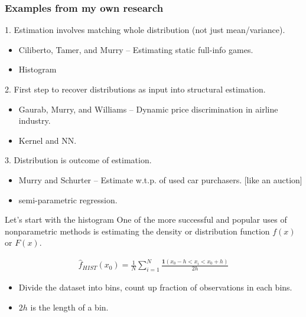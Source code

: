 \documentclass[11pt, aspectratio=169]{beamer}
\begin{document}

\begin{frame}[c]\frametitle{Examples from my own research}
    

1. Estimation involves matching whole distribution (not just mean/variance).\\[-.25em]
\begin{itemize}
  \item Ciliberto, Tamer, and Murry -- Estimating static full-info games. 
  \item Histogram
\end{itemize}

2. First step to recover distributions as input into structural estimation.\\[-.25em]
\begin{itemize}
  \item Gaurab, Murry, and Williams -- Dynamic price discrimination in airline industry. 
  \item Kernel and NN.
\end{itemize}


3. Distribution is outcome of estimation.\\[-.25em]
\begin{itemize}
  \item Murry and Schurter -- Estimate w.t.p. of used car purchasers. [like an auction]
  \item semi-parametric regression.
\end{itemize}


\end{frame}




\begin{frame}{Let's start with the histogram}
  One of the more successful and popular uses of nonparametric methods is estimating the density or distribution function $f(x)$ or $F(x)$.
  
  \begin{eqnarray*}
    \hat{f}_{HIST}(x_0) = \frac{1}{N} \sum_{i=1}^N \frac{\mathbf{1}(x_0 - h < x_i < x_0 + h)}{2 h}
  \end{eqnarray*}
    
  \begin{itemize}
  \item Divide the dataset into bins, count up fraction of observations in each bins.
  \item $2h$ is the length of a bin. 
  \end{itemize}
\end{frame}
 
\end{document}
